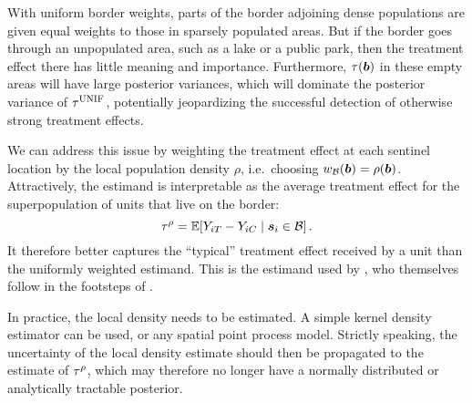 
With uniform border weights, parts of the border adjoining dense populations are given equal weights to those in sparsely populated areas.
But if the border goes through an unpopulated area, such as a lake or a public park, then the treatment effect there has little meaning and importance.
Furthermore, \(\tau(\bm{b})\) in these empty areas will have large posterior variances, which will dominate the posterior variance of \(\tau^{\mathrm{UNIF}}\), potentially jeopardizing the successful detection of otherwise strong treatment effects.

We can address this issue by weighting the treatment effect at each sentinel location by the local population density \(\rho\),
i.e.\ choosing \(w_{\mathcal{B}}(\bm{b}) = \rho(\bm{b})\).
Attractively, the estimand is interpretable as the average treatment effect for the superpopulation of units that live on the border:
\begin{equation}
    \taurho = \E\sbr{Y_{i\treat} - Y_{i\ctrol} \mid \svec_i \in \border}\,.
\end{equation}
It therefore better captures the ``typical'' treatment effect received by a unit than the uniformly weighted estimand.
This is the estimand used by \citet{keele_titiunik_2015}, who themselves follow in the footsteps of \citet{imbens2011regression}.

In practice, the local density needs to be estimated.
A simple kernel density estimator can be used,
or any spatial point process model.
Strictly speaking, the uncertainty of the local density estimate should then be propagated to the estimate of \(\tau^{\rho}\), which may therefore no longer have a normally distributed or analytically tractable posterior.

